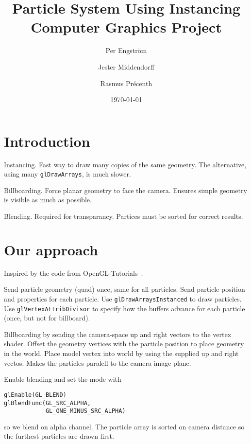 \documentclass[a4paper, twocolumn, DIV=15]{scrartcl}
\title{\LARGE Particle System Using Instancing\\
    \normalfont \Large Computer Graphics Project}
\author{Per Engström \and Jester Middendorff \and Rasmus Précenth}
\date{\today}
\begin{document}
\maketitle

\thispagestyle{empty}

\section{Introduction}
\label{sec:introduction}

Instancing. Fast way to draw many copies of the same geometry. The alternative, using many \texttt{glDrawArrays}, is much slower.

Billboarding. Force planar geometry to face the camera. Ensures simple geometry is visible as much as possible.

Blending. Required for transparancy. Partices must be sorted for correct results.

\section{Our approach}
\label{sec:our_approach}

Inspired by the code from OpenGL-Tutorials~\cite{opengl-tutorial}.

Send particle geometry (quad) once, same for all particles. Send particle position and properties for each particle. Use \texttt{glDrawArraysInstanced} to draw particles. Use \texttt{glVertexAttribDivisor} to specify how the buffers advance for each particle (once, but not for billboard).

Billboarding by sending the camera-space up and right vectors to the vertex shader. Offset the geometry vertices with the particle position to place geometry in the world. Place model vertex into world by using the supplied up and right vectos. Makes the particles paralell to the camera image plane.

Enable blending and set the mode with
\begin{verbatim}
glEnable(GL_BLEND)
glBlendFunc(GL_SRC_ALPHA,
            GL_ONE_MINUS_SRC_ALPHA)
\end{verbatim}
so we blend on alpha channel. The particle array is sorted on camera distance so the furthest particles are drawn first.

\printbibliography
\end{document}
